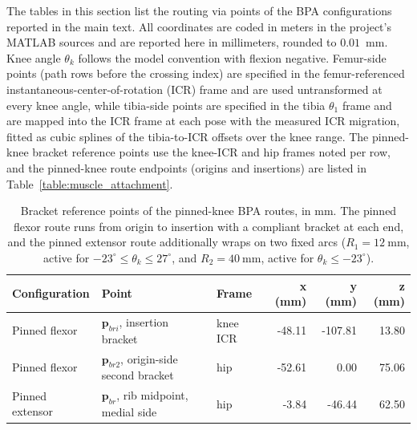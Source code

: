 \documentclass[utf8]{frontiers_suppmat} %
\begin{document}
The tables in this section list the routing via points of the BPA configurations reported in the main text. All coordinates are coded in meters in the project's MATLAB sources and are reported here in millimeters, rounded to $0.01$~mm. Knee angle $\theta_{k}$ follows the model convention with flexion negative. Femur-side points (path rows before the crossing index) are specified in the femur-referenced instantaneous-center-of-rotation (ICR) frame and are used untransformed at every knee angle, while tibia-side points are specified in the tibia $\theta_{1}$ frame and are mapped into the ICR frame at each pose with the measured ICR migration, fitted as cubic splines of the tibia-to-ICR offsets over the knee range. The pinned-knee bracket reference points use the knee-ICR and hip frames noted per row, and the pinned-knee route endpoints (origins and insertions) are listed in Table~\ref{table:muscle_attachment}.

\begin{table}[htbp]
\caption{Bracket reference points of the pinned-knee BPA routes, in mm. The pinned flexor route runs from origin to insertion with a compliant bracket at each end, and the pinned extensor route additionally wraps on two fixed arcs ($R_{1} = \qty{12}{\milli\metre}$, active for $-23^{\circ} \leq \theta_{k} \leq 27^{\circ}$, and $R_{2} = \qty{40}{\milli\metre}$, active for $\theta_{k} \leq -23^{\circ}$).}
\label{tab:RoutePinnedBrackets}
\centering
\small
\begin{tabular}{lllrrr}
\hline
\textbf{Configuration} & \textbf{Point} & \textbf{Frame} & \textbf{x (mm)} & \textbf{y (mm)} & \textbf{z (mm)} \\
\hline
Pinned flexor & $\mathbf{p}_{bri}$, insertion bracket & knee ICR & -48.11 & -107.81 & 13.80 \\
Pinned flexor & $\mathbf{p}_{br2}$, origin-side second bracket & hip & -52.61 & 0.00 & 75.06 \\
Pinned extensor & $\mathbf{p}_{br}$, rib midpoint, medial side & hip & -3.84 & -46.44 & 62.50 \\
\hline
\end{tabular}
\end{table}
\end{document}
